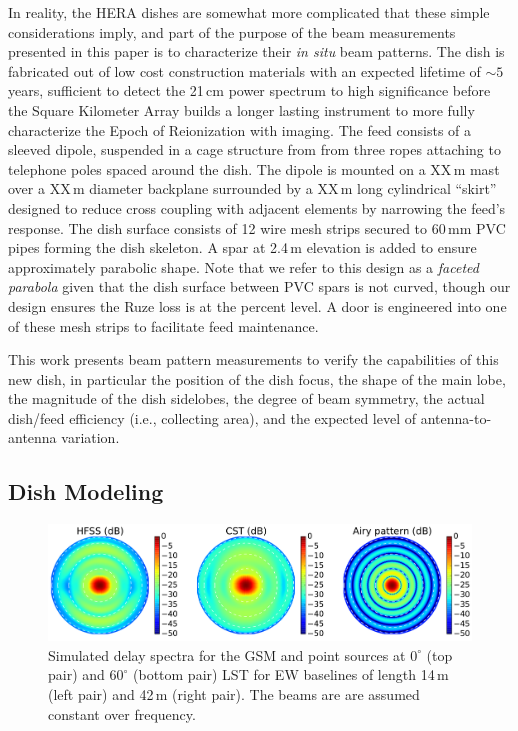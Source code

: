 \documentclass[preprint]{aastex}
\begin{document}
In reality, the HERA dishes are somewhat more complicated that these simple considerations 
imply, and part of the purpose of the beam measurements presented in this paper is to 
characterize their \textit{in situ} beam patterns. The dish is fabricated out of low cost 
construction materials with an expected lifetime of $\sim5$ years, sufficient to detect the 21\,cm 
power spectrum to high significance before the Square Kilometer Array builds a longer lasting 
instrument to more fully characterize the Epoch of Reionization with imaging. The feed consists 
of a sleeved dipole, suspended in a cage structure from from three ropes attaching to telephone 
poles spaced around the dish. The dipole is mounted on a XX\,m mast over a XX\,m diameter backplane surrounded by a XX\,m long cylindrical ``skirt'' designed to reduce cross coupling with adjacent elements 
by narrowing the feed's response. The dish surface consists of 12 wire mesh strips secured to 
60\,mm PVC pipes forming the dish skeleton. A spar at 2.4\,m elevation is added to ensure 
approximately parabolic shape. Note that we refer to this design as a \textit{faceted parabola} 
given that the dish surface between PVC spars is not curved, though our design ensures the 
Ruze loss is at the percent level. A door is engineered into one of these mesh strips to facilitate 
feed maintenance.

This work presents beam pattern measurements to verify the capabilities of this new dish, in particular the 
position of the dish focus, the shape of the main lobe, the magnitude of the dish sidelobes, the 
degree of beam symmetry, the actual dish/feed efficiency (i.e., collecting area), and the expected level of antenna-to-antenna variation.

\subsection{Dish Modeling}
\label{sec:dishmodels}

\begin{figure}
\centering
\includegraphics[width=7in]{dave197_rich195_airy_beams.pdf}
\caption{Simulated delay spectra for the GSM and point sources at $0^\circ$ (top pair) and $60^\circ$ (bottom pair) LST for EW baselines of length 14\,m (left pair) and 42\,m (right pair). The beams are are assumed constant over frequency.}
\label{fig:modelbeams}
\end{figure}
\end{document}
